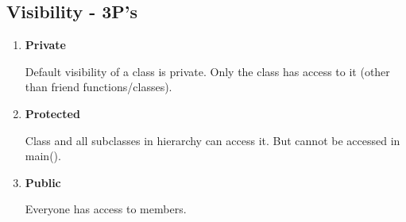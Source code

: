 \documentclass{article}
\begin{document}
    \subsection{Visibility - 3P's}
        \begin{enumerate}
            \item \textbf{Private} 
            
            Default visibility of a class is private. Only the class has access to it (other than friend functions/classes).
            
            \item \textbf{Protected}
            
            Class and all subclasses in hierarchy can access it. But cannot be accessed in main().
            
            \item \textbf{Public}
            
            Everyone has access to members.     
        \end{enumerate}
        
\end{document}
